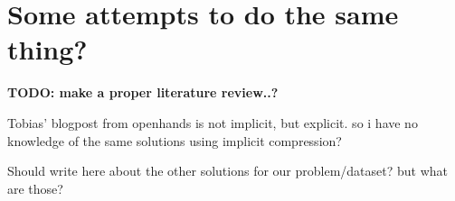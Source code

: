 \section{Some attempts to do the same thing?}

\textbf{TODO: make a proper literature review..?}

Tobias' blogpost from openhands is not implicit, but explicit. so i have no knowledge of the same solutions using implicit compression?

Should write here about the other solutions for our problem/dataset? but what are those?